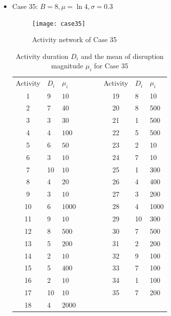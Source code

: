 \documentclass[11pt]{article}
\begin{document}
\begin{itemize}
	        \pagebreak
        \item Case 35: \(B = 8, \mu = \ln 4, \sigma = 0.3\)
            \begin{figure}[H]
    		    \centering
    		    \texttt{[image: case35]}
    		    \caption{Activity network of Case 35}
    		    \label{fig:case35}
	        \end{figure}
	        \begin{table}[H]
	            \centering		
        		\begin{tabular}{ c | l | l l c| l | l}
        		    \cline{1-3}\cline{5-7}
        			Activity & \(D_{i}\) & \(\mu_i\) & \(\qquad\)& Activity & \(D_{i}\) & \(\mu_i\) \\
        			\cline{1-3}\cline{5-7}
        			1 & 9 & \(10\) & & 19 & 8 & 10\\ 
        			2 & 7 & \(40\) & & 20 & 8 & 500\\ 
        			3 & 3 & \(30\) & & 21 & 1 & 500\\ 
        			4 & 4 & \(100\) & & 22 & 5 & 500\\ 
        			5 & 6 & \(50\) & & 23 & 2 & 10\\ 
        			6 & 3 & \(10\) & & 24 & 7 & 10 \\ 
        			7 & 10 & \(10\) & & 25 & 1 & 300 \\ 
        			8 & 4 & \(20\) & & 26 & 4 & 400 \\ 
        			9 & 3 & \(10\) & & 27 & 3 & 200 \\ 
        			10 & 6 & \(1000\) & & 28 & 4 & 1000 \\ 
        			11 & 9 & \(10\) & & 29 & 10 & 300\\ 
        			12 & 8 & \(500\) & & 30 & 7 & 500\\ 
        			13 & 5 & \(200\) & & 31 & 2 & 200\\ 
        			14 & 2 & \(10\) & & 32 & 9 & 100\\ 
        			15 & 5 & \(400\) & & 33 & 7 & 100\\ 
        			16 & 2 & \(10\) & & 34 & 1 & 100 \\ 
        			17 & 10 & \(10\) & & 35 & 7 & 200 \\ 
        			18 & 4 & \(2000\) & & & & \\ 
        			\cline{1-3}\cline{5-7}
        		\end{tabular}
        		\caption{Activity duration \(D_i\) and the mean of disruption magnitude \(\mu_i\) for Case 35}
        		\label{table:case35}
	        \end{table}
    \end{itemize}
    
\end{document}
